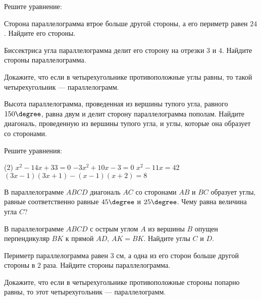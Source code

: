 \begin{class}[number=7]
	\begin{listofex}	
		\item Решите уравнение:
	\begin{enumcols}[itemcolumns=2]
		\item {}
		\item {}
		\item {}
		\item {}
	\end{enumcols}
	\begin{enumcols}[itemcolumns=2]
		\item {}
		\item {}
		\item {}
		\item {}
	\end{enumcols}
	\item Сторона параллелограмма втрое больше другой стороны, а его периметр равен \( 24 \). Найдите его стороны.
	\item Биссектриса угла параллелограмма делит его сторону на отрезки \( 3 \) и \( 4 \). Найдите стороны параллелограмма.
	\item Докажите, что если в четырехугольнике противоположные углы равны, то такой четырехугольник --- параллелограмм.
	\item Высота параллелограмма, проведенная из вершины тупого угла, равного \( 150\degree \), равна двум и делит сторону параллелограмма пополам. Найдите диагональ, проведенную из вершины тупого угла, и углы, которые она образует со сторонами.
	\end{listofex}
\end{class}
%
%
\begin{exam}
	\begin{listofex}
		\item Решите уравнения:
		\begin{tasks}(2)
		\task \(x^2-14x+33=0\)
		\task \(-3x^2+10x-3=0\)
		\task \(x^2-11x=42\)
		\task \((3x-1)(3x+1)-(x-1)(x+2)=8\)
	\end{tasks}
		\item В параллелограмме  \(ABCD\) диагональ \(AC\) со сторонами \(AB\) и \(BC\) образует углы, равные соответственно равные \(45\degree\) и \(25\degree\). Чему равна величина угла \(C\)?
		\item В параллелограмме \(ABCD\)  с острым углом \(A\) из вершины \(B\) опущен перпендикуляр \(BK\) к прямой \(AD\), \(AK=BK\). Найдите углы \(C\) и \(D\).
		\item Периметр параллелограмма равен \( 3 \) см, а одна из его сторон больше другой стороны в \(2\)  раза. Найдите стороны параллелограмма.
		\item Докажите, что если в четырехугольнике противоположные стороны попарно равны, то этот четырехугольник --- параллелограмм. 
	\end{listofex}
\end{exam}
